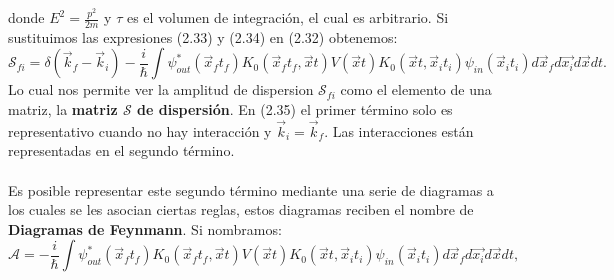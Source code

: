 donde $E^2=\frac{p^2}{2m}$ y $\tau$ es el volumen de integración, el cual es arbitrario. Si sustituimos las expresiones (2.33) y (2.34) en (2.32) obtenemos:
\begin{equation}
\mathcal{S}_{fi}=\delta(\vec{k}_f-\vec{k}_i)-\frac{i}{\hbar}\int\psi_{out}^{*}(\vec{x}_{f}t_{f})K_{0}(\vec{x}_{f}t_{f},\vec{x}t)V(\vec{x}t)K_{0}(\vec{x}t,\vec{x}_{i}t_{i})\psi_{in}(\vec{x}_{i}t_{i})d\vec{x}_{f}d\vec{x_{i}}d\vec{x}dt.
\end{equation}
Lo cual nos permite ver la amplitud de dispersion $\mathcal{S}_{fi}$ como el elemento de una matriz, la \textbf{matriz $\mathcal{S}$ de dispersión}. En (2.35) el primer término solo es representativo cuando no hay interacción y $\vec{k}_i=\vec{k}_f$. Las interacciones están representadas en el segundo término.\\
\\
Es posible representar este segundo término mediante una serie de diagramas a los cuales se les asocian ciertas reglas, estos diagramas reciben el nombre de \textbf{Diagramas de Feynmann}. Si nombramos:
\begin{equation}
\mathcal{A}=-\frac{i}{\hbar}\int\psi_{out}^{*}(\vec{x}_{f}t_{f})K_{0}(\vec{x}_{f}t_{f},\vec{x}t)V(\vec{x}t)K_{0}(\vec{x}t,\vec{x}_{i}t_{i})\psi_{in}(\vec{x}_{i}t_{i})d\vec{x}_{f}d\vec{x_{i}}d\vec{x}dt,
\end{equation}


